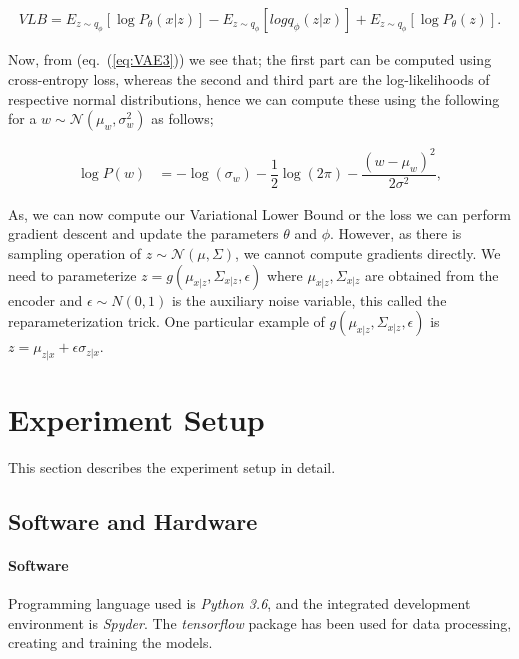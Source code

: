 \documentclass{article}
\begin{document}
	\begin{align} 
	VLB = E_{z \sim q_{\phi}}  \left[ \log P_{\theta}(x|z) \right] - E_{z \sim q_{\phi}}  \left[ log q_{\phi}(z|x)\right] + E_{z \sim q_{\phi}}\left[\log P_{\theta}(z)\right]. \label{eq:VAE3}
	\end{align} 
	
	Now, from (eq.~(\ref{eq:VAE3})) we see that; the first part can be computed using cross-entropy loss, whereas the second and third part are the log-likelihoods of respective normal distributions, hence we can compute these using the following for a $w \sim \mathcal{N}(\mu_w,\sigma^{2}_{w})$	as follows;
	
	\begin{align} 
	\log P(w) &= -\log (\sigma_{w}) - \dfrac{1}{2}\log (2\pi) - \dfrac{(w-\mu_{w})^2}{2\sigma^{2}} , \label{eq:VAE4}
	\end{align}
	
	As, we can now compute our Variational Lower Bound or the loss we can perform gradient descent and update the parameters $\theta$ and $\phi$. However, as there is sampling operation of $z \sim \mathcal{N}(\mu,\Sigma)$, we cannot compute gradients directly. We need to parameterize $z=g(\mu_{x|z},\Sigma_{x|z},\epsilon)$ where $\mu_{x|z},\Sigma_{x|z}$ are obtained from the encoder and $\epsilon \sim {N}(0,1)$ is the auxiliary noise variable, this called the reparameterization trick. One particular example of $g(\mu_{x|z},\Sigma_{x|z},\epsilon)$ is $z = \mu_{z|x} + \epsilon \sigma_{z|x} $.	

	\section{Experiment Setup}\label{section:ExperimentSetup}
	This section describes the experiment setup in detail.
	
	\subsection{Software and Hardware}\label{subsection:SoftwareHardware}
	

	\paragraph{Software} Programming language used is \emph{Python 3.6}, and the integrated development environment is \emph{Spyder}. The \emph{tensorflow} package has been used for data processing, creating and training the models.
\end{document}

